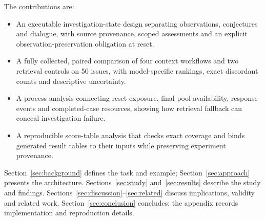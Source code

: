 The contributions are:
\begin{itemize}
\item An executable investigation-state design separating observations, conjectures and dialogue, with source provenance, scoped assessments and an explicit observation-preservation obligation at reset.
\item A fully collected, paired comparison of four context workflows and two retrieval controls on 50 issues, with model-specific rankings, exact discordant counts and descriptive uncertainty.
\item A process analysis connecting reset exposure, final-pool availability, response events and completed-case resources, showing how retrieval fallback can conceal investigation failure.
\item A reproducible score-table analysis that checks exact coverage and binds generated result tables to their inputs while preserving experiment provenance.
\end{itemize}

Section~\ref{sec:background} defines the task and example; Section~\ref{sec:approach} presents the architecture. Sections~\ref{sec:study} and~\ref{sec:results} describe the study and findings. Sections~\ref{sec:discussion}--\ref{sec:related} discuss implications, validity and related work. Section~\ref{sec:conclusion} concludes; the appendix records implementation and reproduction details.

